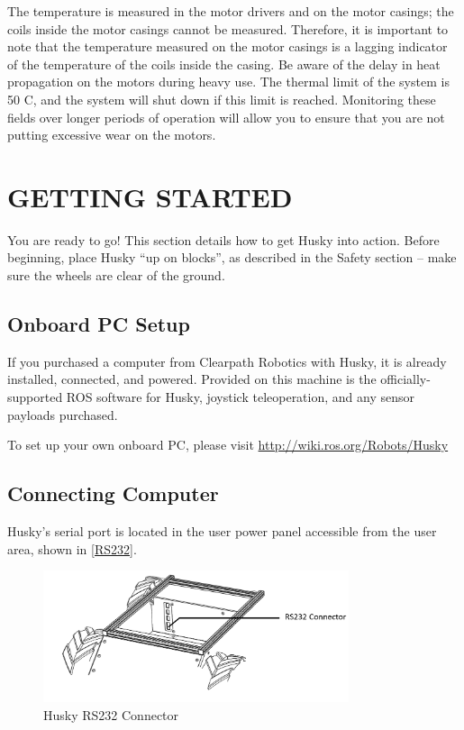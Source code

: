 \documentclass[]{clearpath-latex/clearpath-manual}
\begin{document}
The temperature is measured in the motor drivers and on the motor casings; the coils inside the motor casings cannot be measured.
Therefore, it is important to note that the temperature measured on the motor casings is a lagging indicator of 
the temperature of the coils inside the casing. Be aware of the delay in heat propagation on the motors during heavy use. 
The thermal limit of the system is 50 C\degree, and the system will shut down if this limit is reached.
Monitoring these fields over longer periods of operation will allow you to ensure that you are not putting 
excessive wear on the motors.
\newpage

\section{GETTING STARTED}

You are ready to go! This section details how to get Husky into action.
Before beginning, place Husky “up on blocks”, as described in the Safety section – make sure the wheels are clear of the ground.


\subsection{Onboard PC Setup}

If you purchased a computer from Clearpath Robotics with Husky, it is already installed, connected, and powered. 
Provided on this machine is the officially-supported ROS software for Husky, joystick teleoperation, and any sensor payloads purchased.

To set up your own onboard PC, please visit \url{http://wiki.ros.org/Robots/Husky}


\subsection{Connecting Computer}

Husky’s serial port is located in the user power panel accessible from the user area, shown in \autoref{RS232}.

\begin{figure}[h]
	\centering
	\includegraphics[width=0.8\textwidth]{RS232.png}
	\caption{Husky RS232 Connector}
	\label{RS232}
\end{figure}
\end{document}

